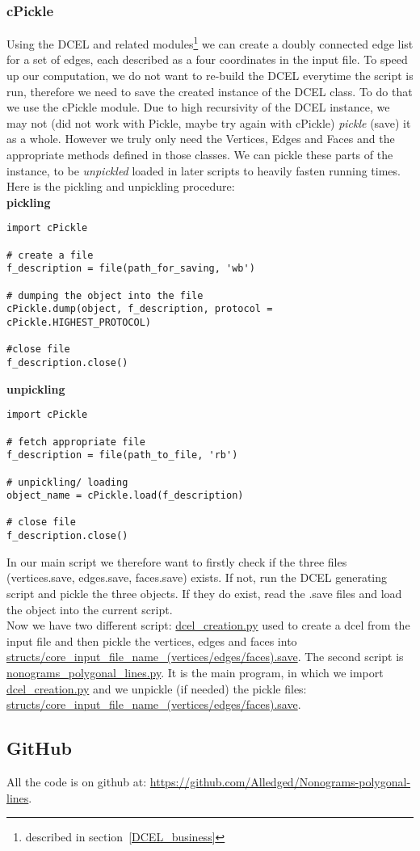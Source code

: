 \documentclass{article}
\begin{document}
\subsubsection{cPickle}
Using the DCEL and related modules\footnote{described in section~\ref{DCEL_business}} we can create a doubly connected edge list for a set of edges, each described as a four coordinates in the input file. To speed up our computation, we do not want to re-build the DCEL everytime the script is run, therefore we need to save the created instance of the DCEL class. To do that we use the cPickle module. Due to high recursivity of the DCEL instance, we may not (did not work with Pickle, maybe try again with cPickle) \emph{pickle} (save) it as a whole. However we truly only need the Vertices, Edges and Faces and the appropriate methods defined in those classes. We can pickle these parts of the instance, to be \emph{unpickled} loaded in later scripts to heavily fasten running times. Here is the pickling and unpickling procedure:\\ 


{\bf pickling}
\begin{verbatim}
import cPickle

# create a file
f_description = file(path_for_saving, 'wb')

# dumping the object into the file
cPickle.dump(object, f_description, protocol = cPickle.HIGHEST_PROTOCOL)

#close file
f_description.close()
\end{verbatim}


{\bf unpickling}
\begin{verbatim}
import cPickle

# fetch appropriate file
f_description = file(path_to_file, 'rb')

# unpickling/ loading
object_name = cPickle.load(f_description)

# close file
f_description.close()
\end{verbatim}


In our main script we therefore want to firstly check if the three files (vertices.save, edges.save, faces.save) exists. If not, run the DCEL generating script and pickle the three objects. If they do exist, read the .save files and load the object into the current script.\\

Now we have two different script: \url{dcel_creation.py} used to create a dcel from the input file and then pickle the vertices, edges and faces into \url{structs/core_input_file_name_(vertices/edges/faces).save}. The second script is \url{nonograms_polygonal_lines.py}. It is the main program, in which we import \url{dcel_creation.py} and we unpickle (if needed) the pickle files: \url{structs/core_input_file_name_(vertices/edges/faces).save}.

\subsection{GitHub}
All the code is on github at: \url{https://github.com/Alledged/Nonograms-polygonal-lines}. 
\end{document}
